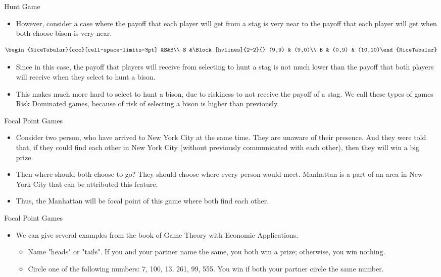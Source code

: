 \documentclass[
  ignorenonframetext,
]{beamer}
\begin{document}
\begin{frame}{Hunt Game}
\protect\hypertarget{hunt-game-4}{}
\begin{itemize}
  \item However, consider a case where the payoff that each player will get from a stag is very near to the payoff that each player will get when both choose bison is very near.
\end{itemize}

\[\begin{NiceTabular}{ccc}[cell-space-limits=3pt] &S&B\\
S &\Block[hvlines]{2-2}{} (9,9) & (9,0)\\
B & (0,9) & (10,10)\end{NiceTabular}\]

\begin{itemize}
  \item Since in this case, the payoff that players will receive from selecting to hunt a stag is not much lower than the payoff that both players will receive when they select to hunt a bison.
  \item This makes much more hard to select to hunt a bison, due to riskiness to not receive the payoff of a stag. We call these types of games Risk Dominated games, because of risk of selecting a bison is higher than previously.
\end{itemize}
\end{frame}

\begin{frame}{Focal Point Games}
\protect\hypertarget{focal-point-games}{}
\begin{itemize}
  \item Consider two person, who have arrived to New York City at the same time. They are unaware of their presence. And they were told that, if they could find each other in New York City (without previously communicated with each other), then they will win a big prize.
  \item Then where should both choose to go? They should choose where every person would meet. Manhattan is a part of an area in New York City that can be attributed this feature.
  \item Thus, the Manhattan will be focal point of this game where both find each other.
\end{itemize}
\end{frame}

\begin{frame}{Focal Point Games}
\protect\hypertarget{focal-point-games-1}{}
\begin{itemize}
  \item We can give several examples from the book of Game Theory with Economic Applications.
  \begin{itemize}
    \item Name "heads" or "tails". If you and your partner name the same, you both win a prize; otherwise, you win nothing.
    \item Circle one of the following numbers: 7, 100, 13, 261, 99, 555. You win if both your partner circle the same number.
    \end{itemize}
\end{itemize}
\end{frame}
\end{document}
